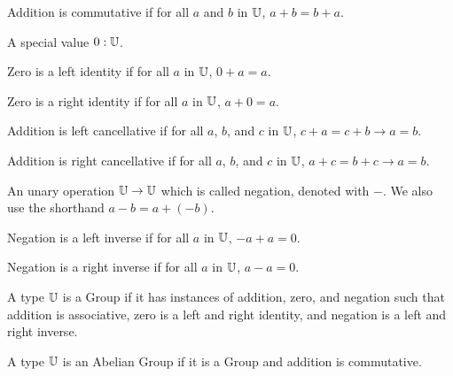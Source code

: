 \documentclass[../../math.tex]{subfiles}
\begin{document}
\begin{class}
    Addition is commutative if for all $a$ and $b$ in $\mathbb{U}$, $a + b = b + a$.
\end{class}

\begin{class}
    A special value $0 : \mathbb{U}$.
\end{class}

\begin{class}
    Zero is a left identity if for all $a$ in $\mathbb{U}$, $0 + a = a$.
\end{class}

\begin{class}
    Zero is a right identity if for all $a$ in $\mathbb{U}$, $a + 0 = a$.
\end{class}

\begin{class}
    Addition is left cancellative if for all $a$, $b$, and $c$ in $\mathbb{U}$, $c + a =
    c + b \rightarrow a = b$.
\end{class}

\begin{class}
    Addition is right cancellative if for all $a$, $b$, and $c$ in $\mathbb{U}$, $a + c
    = b + c \rightarrow a = b$.
\end{class}

\begin{class}
    An unary operation $\mathbb{U} \rightarrow \mathbb{U}$ which is called negation, denoted
    with $-$.  We also use the shorthand $a - b = a + (-b)$.
\end{class}

\begin{class}
    Negation is a left inverse if for all $a$ in $\mathbb{U}$, $-a + a = 0$.
\end{class}

\begin{class}
    Negation is a right inverse if for all $a$ in $\mathbb{U}$, $a - a = 0$.
\end{class}

\begin{class}[Group]
    A type $\mathbb{U}$ is a Group if it has instances of addition, zero, and negation
    such that addition is associative, zero is a left and right identity, and
    negation is a left and right inverse.
\end{class}

\begin{class}
    A type $\mathbb{U}$ is an Abelian Group if it is a Group and addition is
    commutative.
\end{class}
\end{document}
